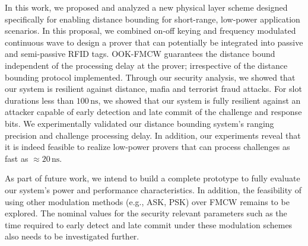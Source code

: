 \documentclass{sig-alternate-10pt}
\newcommand{\eg}{e.g.,\xspace}
\newcommand{\unit}[1]{\ensuremath{\, \mathrm{#1}}}
\begin{document}
In this work, we proposed and analyzed a new physical layer scheme designed
specifically for enabling distance bounding for short-range, low-power
application scenarios. In this proposal, we combined on-off keying and frequency
modulated continuous wave to design a prover that can potentially be integrated
into passive and semi-passive RFID tags. OOK-FMCW guarantees the distance bound
independent of the processing delay at the prover; irrespective of the distance
bounding protocol implemented. Through our security analysis, we showed that our
system is resilient against distance, mafia and terrorist fraud attacks. For
slot durations less than $100\unit{ns}$, we showed that our system is fully
resilient against an attacker capable of early detection and late commit of the
challenge and response bits. We experimentally validated our distance bounding
system's ranging precision and challenge processing delay. In addition, our
experiments reveal that it is indeed feasible to realize low-power provers that
can process challenges as fast as $\approx 20\unit{ns}$.

As part of future work, we intend to build a complete prototype to fully
evaluate our system's power and performance characteristics. In addition, the
feasibility of using other modulation methods (\eg ASK, PSK) over FMCW remains
to be explored. The nominal values for the security relevant parameters such as
the time required to early detect and late commit under these modulation schemes
also needs to be investigated further.



\end{document}
